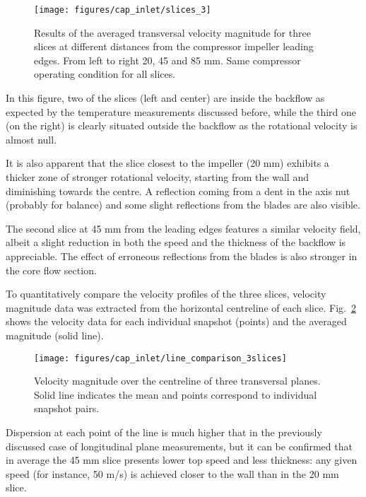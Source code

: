 \begin{figure}[bt!]
\hspace{-0.1\textwidth}
\texttt{[image: figures/cap\_inlet/slices\_3]}
\caption[Transversal velocity fields measured by PIV (location)]{Results of the averaged transversal velocity magnitude for three slices at different distances from the compressor impeller leading edges. From left to right 20, 45 and 85 mm. Same compressor operating condition for all slices.}
\label{fig:slices_3}
\end{figure}

In this figure, two of the slices (left and center) are inside the backflow as expected by the temperature measurements discussed before, while the third one (on the right) is clearly situated outside the backflow as the rotational velocity is almost null.

It is also apparent that the slice closest to the impeller (20 mm) exhibits a thicker zone of stronger rotational velocity, starting from the wall and diminishing towards the centre. A reflection coming from a dent in the axis nut (probably for balance) and some slight reflections from the blades are also visible.

The second slice at 45 mm from the leading edges features a similar velocity field, albeit a slight reduction in both the speed and the thickness of the backflow is appreciable. The effect of erroneous reflections from the blades is also stronger in the core flow section.

To quantitatively compare the velocity profiles of the three slices, velocity magnitude data was extracted from the horizontal centreline of each slice. Fig.~\ref{fig:line_comp_3slices} shows the velocity data for each individual snapshot (points) and the averaged magnitude (solid line).

\begin{figure}[htb!]
\centering
\texttt{[image: figures/cap\_inlet/line\_comparison\_3slices]}
\caption[Centreline velocity in the transversal plane]{Velocity magnitude over the centreline of three transversal planes. Solid line indicates the mean and points correspond to individual snapshot pairs.}
\label{fig:line_comp_3slices}
\end{figure}

Dispersion at each point of the line is much higher that in the previously discussed case of longitudinal plane measurements, but it can be confirmed that in average the 45 mm slice presents lower top speed and less thickness: any given speed (for instance, 50 m/s) is achieved closer to the wall than in the 20 mm slice.

